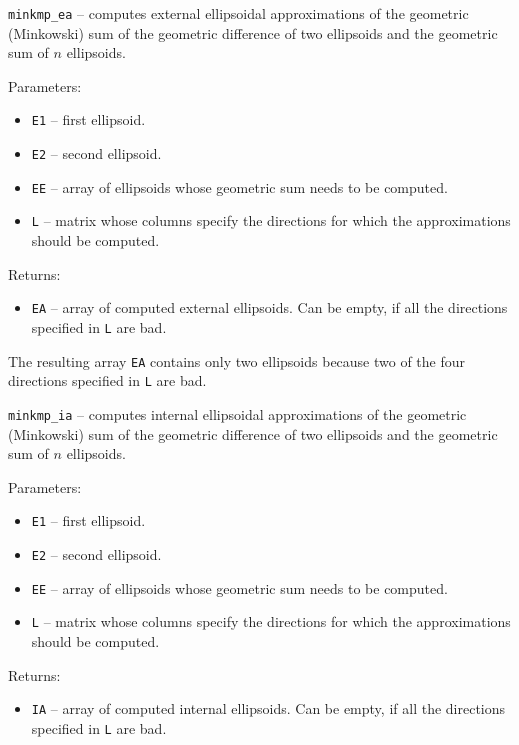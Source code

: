 \newpage

{\Large {\tt minkmp\_ea}} -- computes external ellipsoidal approximations
of the geometric (Minkowski) sum of the geometric difference of two ellipsoids
and the geometric sum of $n$ ellipsoids.

Parameters:
\begin{itemize}
\item {\tt E1} -- first ellipsoid.
\item {\tt E2} -- second ellipsoid.
\item {\tt EE} -- array of ellipsoids whose geometric sum needs to be computed.
\item {\tt L} -- matrix whose columns specify the directions for which
the approximations should be computed.
\end{itemize}

Returns:
\begin{itemize}
\item {\tt EA} -- array of computed external ellipsoids. Can be empty, if
all the directions specified in {\tt L} are bad.
\end{itemize}


The resulting array {\tt EA} contains only two ellipsoids because two
of the four directions specified in {\tt L} are bad.

\newpage

{\Large {\tt minkmp\_ia}} -- computes internal ellipsoidal approximations
of the geometric (Minkowski) sum of the geometric difference of two ellipsoids
and the geometric sum of $n$ ellipsoids.

Parameters:
\begin{itemize}
\item {\tt E1} -- first ellipsoid.
\item {\tt E2} -- second ellipsoid.
\item {\tt EE} -- array of ellipsoids whose geometric sum needs to be computed.
\item {\tt L} -- matrix whose columns specify the directions for which
the approximations should be computed.
\end{itemize}

Returns:
\begin{itemize}
\item {\tt IA} -- array of computed internal ellipsoids. Can be empty, if
all the directions specified in {\tt L} are bad.
\end{itemize}

